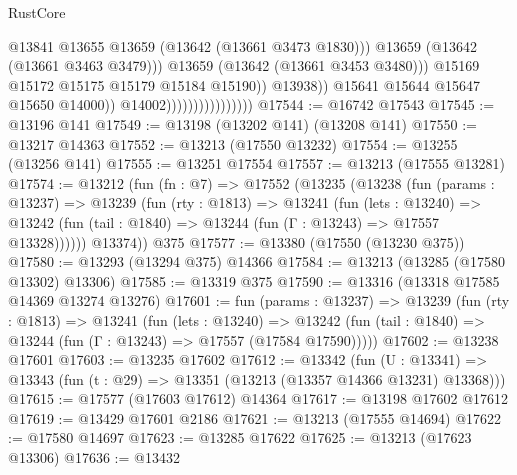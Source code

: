 \begin{lexlean}{RustCore}
\begin{coremodule}
                                                      @13841
                                                      @13655
                                                      @13659
                                                      (@13642 (@13661 @3473 @1830)))
                                                    @13659
                                                    (@13642 (@13661 @3463 @3479)))
                                                  @13659
                                                  (@13642 (@13661 @3453 @3480)))
                                                @15169
                                                @15172
                                                @15175
                                                @15179
                                                @15184
                                                @15190))
                                            @13938))
                                        @15641
                                        @15644
                                        @15647
                                        @15650
                                        @14000))
                                    @14002))))))))))))))))
@17544 := @16742 @17543
@17545 := @13196 @141
@17549 := @13198 (@13202 @141) (@13208 @141)
@17550 := @13217 @14363
@17552 := @13213 (@17550 @13232)
@17554 := @13255 (@13256 @141)
@17555 := @13251 @17554
@17557 := @13213 (@17555 @13281)
@17574 := @13212
    (fun (fn : @7) =>
    @17552
      (@13235
        (@13238
          (fun (params : @13237) =>
          @13239
            (fun (rty : @1813) =>
            @13241
              (fun (lets : @13240) =>
              @13242 (fun (tail : @1840) => @13244 (fun (Γ : @13243) => @17557 @13328))))))
        @13374))
    @375
@17577 := @13380 (@17550 (@13230 @375))
@17580 := @13293 (@13294 @375) @14366
@17584 := @13213 (@13285 (@17580 @13302) @13306)
@17585 := @13319 @375
@17590 := @13316 (@13318 @17585 @14369 @13274 @13276)
@17601 := fun (params : @13237) =>
  @13239
    (fun (rty : @1813) =>
    @13241
      (fun (lets : @13240) =>
      @13242 (fun (tail : @1840) => @13244 (fun (Γ : @13243) => @17557 (@17584 @17590)))))
@17602 := @13238 @17601
@17603 := @13235 @17602
@17612 := @13342
    (fun (U : @13341) => @13343 (fun (t : @29) => @13351 (@13213 (@13357 @14366 @13231) @13368)))
@17615 := @17577 (@17603 @17612) @14364
@17617 := @13198 @17602 @17612
@17619 := @13429 @17601 @2186
@17621 := @13213 (@17555 @14694)
@17622 := @17580 @14697
@17623 := @13285 @17622
@17625 := @13213 (@17623 @13306)
@17636 := @13432

\end{coremodule}
\end{lexlean}
